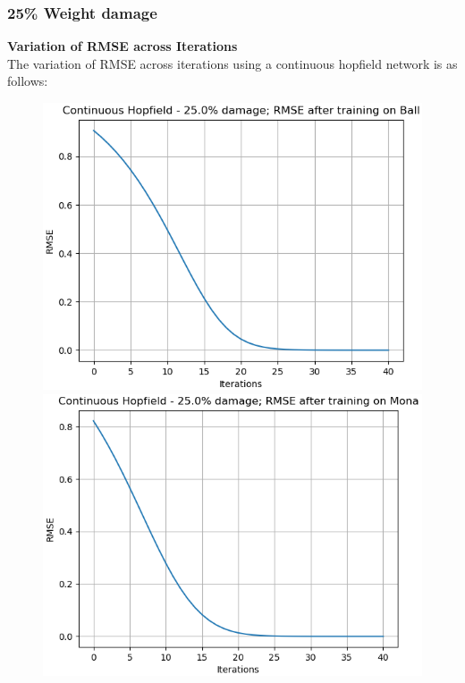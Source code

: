 \documentclass[12pt,a4paper]{article}
\begin{document}
\subsubsection{25\% Weight damage}
\textbf{Variation of RMSE across Iterations}\\
The variation of RMSE across iterations using a continuous hopfield network is as follows:
\begin{figure}[H]
\centering
\includegraphics[scale=0.4]{images/chn_25_ball.png}
\includegraphics[scale=0.4]{images/chn_25_mona.png}

\end{figure}
\end{document}

